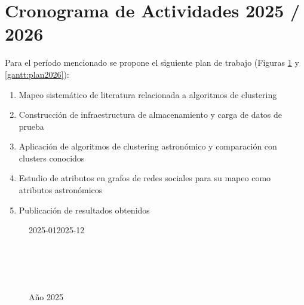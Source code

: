 \documentclass[
	11pt,oneside,a4paper,
	fleqn,
	article
]{memoir}
\begin{document}
\section{Cronograma de Actividades 2025 / 2026}

Para el período mencionado se propone el siguiente plan de trabajo (Figuras \ref{gantt:plan2025} y \ref{gantt:plan2026}):

\begin{enumerate}
	\item Mapeo sistemático de literatura relacionada a algoritmos de clustering
	\item Construcción de infraestructura de almacenamiento y carga de datos de prueba
	\item Aplicación de algoritmos de clustering astronómico y comparación con clusters conocidos
	\item Estudio de atributos en grafos de redes sociales para su mapeo como atributos astronómicos
	\item Publicación de resultados obtenidos
\end{enumerate}

\begin{figure}[H]
	\centering
	\begin{ganttchart}[
			title label font=\tiny,
			bar label font=\tiny,
			y unit chart=0.7cm,
			hgrid,
			vgrid,
			x unit=0.8cm,
			bar/.append style={draw=Black, fill=RoyalBlue!75},
			time slot format=isodate-yearmonth,
			time slot unit=month,
			newline shortcut=true,
			bar label node/.append style={align=right}
		]{2025-01}{2025-12}
		 \\
		 \\
		\\
		\\
		\\
	\end{ganttchart}
	\caption{Año 2025}
	\label{gantt:plan2025}
\end{figure}
\end{document}
